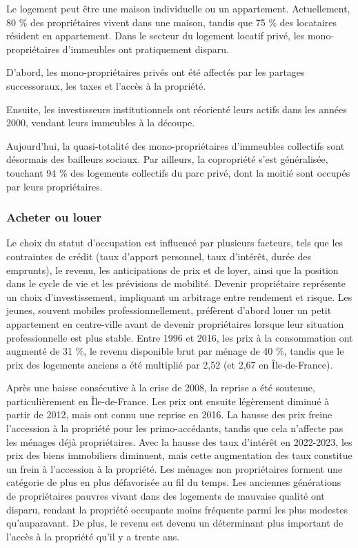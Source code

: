 \documentclass[a4paper, 12pt]{report}
\begin{document}
Le logement peut être une maison individuelle ou un appartement. Actuellement, 80 \% des propriétaires vivent dans une maison, tandis que 75 \% des locataires résident en appartement. Dans le secteur du logement locatif privé, les mono-propriétaires d’immeubles ont pratiquement disparu. 

D'abord, les mono-propriétaires privés ont été affectés par les partages successoraux, les taxes et l’accès à la propriété. 

Ensuite, les investisseurs institutionnels ont réorienté leurs actifs dans les années 2000, vendant leurs immeubles à la découpe. 

Aujourd'hui, la quasi-totalité des mono-propriétaires d’immeubles collectifs sont désormais des bailleurs sociaux. Par ailleurs, la copropriété s’est généralisée, touchant 94 \% des logements collectifs du parc privé, dont la moitié sont occupés par leurs propriétaires.

\subsubsection{Acheter ou louer}

Le choix du statut d’occupation est influencé par plusieurs facteurs, tels que les contraintes de crédit (taux d’apport personnel, taux d’intérêt, durée des emprunts), le revenu, les anticipations de prix et de loyer, ainsi que la position dans le cycle de vie et les prévisions de mobilité. Devenir propriétaire représente un choix d’investissement, impliquant un arbitrage entre rendement et risque. Les jeunes, souvent mobiles professionnellement, préfèrent d’abord louer un petit appartement en centre-ville avant de devenir propriétaires lorsque leur situation professionnelle est plus stable. Entre 1996 et 2016, les prix à la consommation ont augmenté de 31 \%, le revenu disponible brut par ménage de 40 \%, tandis que le prix des logements anciens a été multiplié par 2,52 (et 2,67 en Île-de-France).

Après une baisse consécutive à la crise de 2008, la reprise a été soutenue, particulièrement en Île-de-France. Les prix ont ensuite légèrement diminué à partir de 2012, mais ont connu une reprise en 2016. La hausse des prix freine l’accession à la propriété pour les primo-accédants, tandis que cela n'affecte pas les ménages déjà propriétaires. Avec la hausse des taux d’intérêt en 2022-2023, les prix des biens immobiliers diminuent, mais cette augmentation des taux constitue un frein à l’accession à la propriété. Les ménages non propriétaires forment une catégorie de plus en plus défavorisée au fil du temps. Les anciennes générations de propriétaires pauvres vivant dans des logements de mauvaise qualité ont disparu, rendant la propriété occupante moins fréquente parmi les plus modestes qu'auparavant. De plus, le revenu est devenu un déterminant plus important de l’accès à la propriété qu’il y a trente ans.
\end{document}
